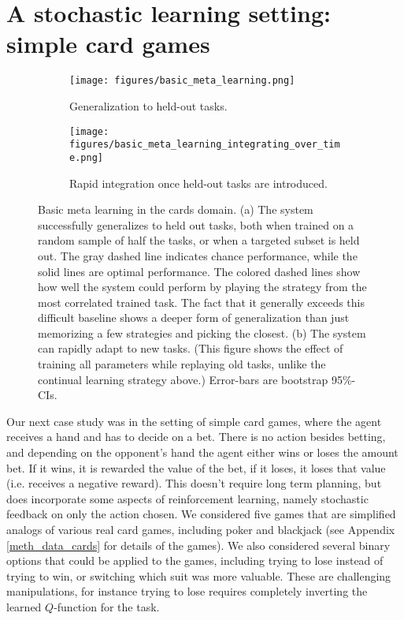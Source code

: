 \documentclass{article}
\begin{document}
\section{A stochastic learning setting: simple card games}
\begin{figure}
\centering
\begin{subfigure}[t]{0.5\textwidth}
\texttt{[image: figures/basic\_meta\_learning.png]}
\caption{Generalization to held-out tasks.}
\label{cards_basic_results}
\end{subfigure}%
\begin{subfigure}[t]{0.5\textwidth}
\texttt{[image: figures/basic\_meta\_learning\_integrating\_over\_time.png]}
\caption{Rapid integration once held-out tasks are introduced.}
\label{cards_basic_integration_results}
\end{subfigure}
\caption{Basic meta learning in the cards domain. (a) The system successfully generalizes to held out tasks, both when trained on a random sample of half the tasks, or when a targeted subset is held out. The gray dashed line indicates chance performance, while the solid lines are optimal performance. The colored dashed lines show how well the system could perform by playing the strategy from the most correlated trained task. The fact that it generally exceeds this difficult baseline shows a deeper form of generalization than just memorizing a few strategies and picking the closest. (b) The system can rapidly adapt to new tasks. (This figure shows the effect of training all parameters while replaying old tasks, unlike the continual learning strategy above.) Error-bars are bootstrap 95\%-CIs.}
\end{figure}
Our next case study was in the setting of simple card games, where the agent receives a hand and has to decide on a bet. There is no action besides betting, and depending on the opponent's hand the agent either wins or loses the amount bet. If it wins, it is rewarded the value of the bet, if it loses, it loses that value (i.e. receives a negative reward). This doesn't require long term planning, but does incorporate some aspects of reinforcement learning, namely stochastic feedback on only the action chosen. We considered five games that are simplified analogs of various real card games, including poker and blackjack (see Appendix \ref{meth_data_cards} for details of the games). We also considered several binary options that could be applied to the games, including trying to lose instead of trying to win, or switching which suit was more valuable. These are challenging manipulations, for instance trying to lose requires completely inverting the learned $Q$-function for the task. \par
\end{document}
